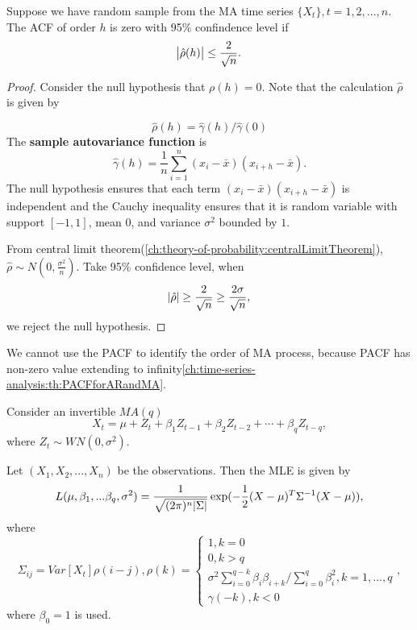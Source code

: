 \begin{lemma}
Suppose we have random sample from the MA time series $\{X_t\},t=1,2,...,n$. The  ACF of order $h$ is zero with 95\% confindence level if
$$\abs{\hat{\rho}(h)} \leq \frac{2}{\sqrt{n}}.$$		
\end{lemma}
\begin{proof}
Consider the null hypothesis that $\rho(h) = 0$. Note that the calculation $\hat{\rho}$ is given by

$$\hat{\rho}(h)=\hat{\gamma}(h)/\hat{\gamma}(0)$$
The \textbf{sample autovariance function} is
 $$\hat{\gamma}(h) = \frac{1}{n}\sum_{i=1}^n(x_i-\bar{x})( x_{i+h} - \bar{x}).$$
The null hypothesis ensures that each term $(x_i-\bar{x})( x_{i+h} - \bar{x})$ is independent and the Cauchy inequality ensures that it is random variable with support $[-1,1]$, mean 0, and variance $\sigma^2$ bounded by $1$.

From central limit theorem(\autoref{ch:theory-of-probability:centralLimitTheorem}), $\hat{\rho} \sim N(0,\frac{\sigma^2}{n}).$ 
Take 95\% confidence level, when $$\abs{\hat{\rho}} \geq \frac{2}{\sqrt{n}}\geq \frac{2\sigma}{\sqrt{n}},$$ we reject the null hypothesis. 
\end{proof}

\begin{remark}
	We cannot use the PACF to identify the order of MA process, because PACF has non-zero value extending to infinity\autoref{ch:time-series-analysis:th:PACFforARandMA}.
\end{remark}

\begin{definition}Consider an invertible $MA(q)$ 
	$$X_t = \mu + Z_t + \beta_1 Z_{t-1} + \beta_2Z_{t-2}+\cdots + \beta_q Z_{t-q},$$
	where $Z_t\sim WN(0, \sigma^2)$.
	
	Let $(X_1,X_2,...,X_n)$ be the observations. Then the MLE is given by
	$$L(\mu, \beta_1,...\beta_q, \sigma^2) = \frac{1}{\sqrt{(2\pi)^n \abs{\Sigma}}} \exp(-\frac{1}{2}(X-\mu)^T\Sigma^{-1}(X-\mu)),$$
	where  	
	$$\Sigma_{ij} = Var[X_t]\rho(i-j),\rho(k) = \begin{cases} 
	1, k=0\\
	0,k>q\\
	\sigma^2 \sum_{i=0}^{q-k}\beta_i\beta_{i+k}/\sum_{i=0}^q \beta_i^2,k=1,...,q\\
	\gamma(-k),k<0
	\end{cases},$$
	where $\beta_0 = 1$ is used.
\end{definition}


